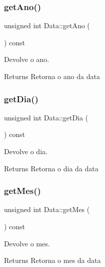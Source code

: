 \subsubsection{\texorpdfstring{get\+Ano()}{getAno()}}
{\footnotesize\ttfamily unsigned int Data\+::get\+Ano (\begin{DoxyParamCaption}{ }\end{DoxyParamCaption}) const}



Devolve o ano. 

\begin{DoxyReturn}{Returns}
Retorna o ano da data 
\end{DoxyReturn}
\mbox{\label{class_data_a459536c9351759b5697ba25456d9bd70}} 
\subsubsection{\texorpdfstring{get\+Dia()}{getDia()}}
{\footnotesize\ttfamily unsigned int Data\+::get\+Dia (\begin{DoxyParamCaption}{ }\end{DoxyParamCaption}) const}



Devolve o dia. 

\begin{DoxyReturn}{Returns}
Retorna o dia da data 
\end{DoxyReturn}
\mbox{\label{class_data_ab991d6a069c799930899b39bef9a4662}} 
\subsubsection{\texorpdfstring{get\+Mes()}{getMes()}}
{\footnotesize\ttfamily unsigned int Data\+::get\+Mes (\begin{DoxyParamCaption}{ }\end{DoxyParamCaption}) const}



Devolve o mes. 

\begin{DoxyReturn}{Returns}
Retorna o mes da data 
\end{DoxyReturn}
\mbox{\label{class_data_a28b51c511a389cf30b9d1d2da858f3f6}} 
